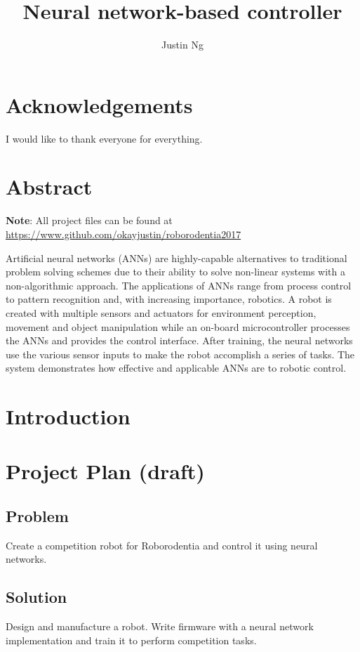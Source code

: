 \documentclass[12pt,letterpaper,titlepage]{report}
\title{Neural network-based controller}
\author{Justin Ng}
\begin{document}

\newpage
{}
\tableofcontents
\listoffigures
\listoftables


\chapter*{Acknowledgements}
I would like to thank everyone for everything.


\chapter*{Abstract}
\textbf{Note}: All project files can be found at \url{https://www.github.com/okayjustin/roborodentia2017} \

Artificial neural networks (ANNs) are highly-capable alternatives to traditional problem solving schemes due to their ability to solve non-linear systems with a non-algorithmic approach. The applications of ANNs range from process control to pattern recognition and, with increasing importance, robotics. A robot is created with multiple sensors and actuators for environment perception, movement and object manipulation while an on-board microcontroller processes the ANNs and provides the control interface. After training, the neural networks use the various sensor inputs to make the robot accomplish a series of tasks. The system demonstrates how effective and applicable ANNs are to robotic control. 


\chapter{Introduction}

\chapter{Project Plan (draft)}
\section{Problem}
Create a competition robot for Roborodentia and control it using neural networks.

\section{Solution}
Design and manufacture a robot. Write firmware with a neural network implementation and train it to perform competition tasks. 
\end{document}

